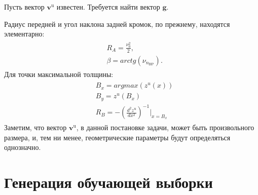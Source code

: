 Пусть вектор $\mathbf{v}^\text{u}$ известен. Требуется найти вектор $\mathbf{g}$.

Радиус передней и угол наклона задней кромок, по прежнему, находятся элементарно:
\begin{eqnarray}\label{eq:inv prob 1}
  \begin{aligned}
    &R_A = \frac{\nu_0^2}{2}, \\
    &\beta = arctg(\nu_{n_\text{BP}}).
  \end{aligned}
\end{eqnarray}
Для точки максимальной толщины:
\begin{eqnarray}\label{eq:inv prob 2}
  \begin{aligned}
    &B_x = argmax(z^u(x)) \\
    &B_y = z^u(B_x) \\
    &R_B = -\left(\frac{d^2 z^\text{u}}{dx^2}\right)^{-1} \bigg|_{x = B_x}
  \end{aligned}
\end{eqnarray}
Заметим, что вектор $\mathbf{v}^\text{u}$, в данной постановке задачи, может быть произвольного размера, и, тем ни менее, геометрические параметры будут определяться однозначно.

\section{Генерация обучающей выборки}

